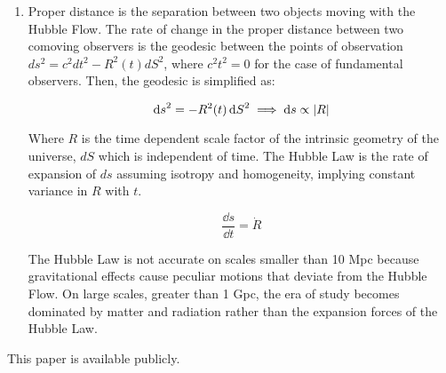 \documentclass{paper}
\begin{document}
\begin{enumerate}
   \item %
      Proper distance is the separation between two objects moving with the
      Hubble Flow. The rate of change in the proper distance between two
      comoving observers is the geodesic between the points of observation
      \(ds^2 = c^2dt^2 - R^2(t)dS^2\), where \(c^2t^2 = 0 \) for the case of
      fundamental observers. Then, the geodesic is simplified as:

      \begin{equation}
        \dd{s}^2 = - {R}^2(t)\dd{S}^2 \implies \dd{s} \propto \abs{R}
      \end{equation}

      Where \(R\) is the time dependent scale factor of the intrinsic 
      geometry of the universe, \(dS\) which is independent of time. 
      The Hubble Law is the rate of expansion of \(ds\) assuming isotropy
      and homogeneity, implying constant variance in \(R\) with \(t\).

      \[ \frac{\dd{s}}{\dd{t}} = \dot{R} \]

      The Hubble Law is not accurate on scales smaller than 10 Mpc because 
      gravitational effects cause peculiar motions that deviate from the 
      Hubble Flow. On large scales, greater than 1 Gpc, the era of study
      becomes dominated by matter and radiation rather than the expansion
      forces of the Hubble Law.

\end{enumerate}

This paper is available publicly.\cite{Hayden_Cosmology_Source_Repo}

\pagebreak
\printbibliography
\end{document}
